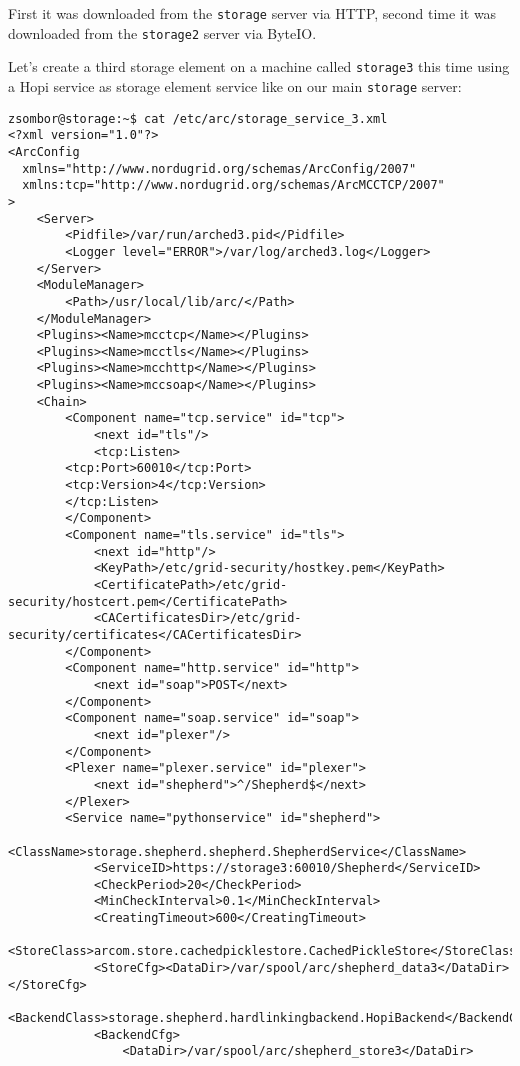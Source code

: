 \documentclass{book}
\begin{document}
First it was downloaded from the \verb!storage! server via HTTP, second time it was downloaded from the \verb!storage2! server via ByteIO.

Let's create a third storage element on a machine called \verb!storage3! this time using a Hopi service as storage element service like on our main \verb!storage! server:

\begin{verbatim}
zsombor@storage:~$ cat /etc/arc/storage_service_3.xml 
<?xml version="1.0"?>
<ArcConfig 
  xmlns="http://www.nordugrid.org/schemas/ArcConfig/2007"
  xmlns:tcp="http://www.nordugrid.org/schemas/ArcMCCTCP/2007"
>
    <Server>
        <Pidfile>/var/run/arched3.pid</Pidfile>
        <Logger level="ERROR">/var/log/arched3.log</Logger>
    </Server>
    <ModuleManager>
        <Path>/usr/local/lib/arc/</Path>
    </ModuleManager>
    <Plugins><Name>mcctcp</Name></Plugins>
    <Plugins><Name>mcctls</Name></Plugins>
    <Plugins><Name>mcchttp</Name></Plugins>
    <Plugins><Name>mccsoap</Name></Plugins>
    <Chain>
        <Component name="tcp.service" id="tcp">
            <next id="tls"/> 
            <tcp:Listen>
		<tcp:Port>60010</tcp:Port>
		<tcp:Version>4</tcp:Version>
	    </tcp:Listen>
        </Component>
        <Component name="tls.service" id="tls">
            <next id="http"/>
            <KeyPath>/etc/grid-security/hostkey.pem</KeyPath>
            <CertificatePath>/etc/grid-security/hostcert.pem</CertificatePath>
            <CACertificatesDir>/etc/grid-security/certificates</CACertificatesDir>
        </Component>
        <Component name="http.service" id="http">
            <next id="soap">POST</next>
        </Component>
        <Component name="soap.service" id="soap">
            <next id="plexer"/>
        </Component>
        <Plexer name="plexer.service" id="plexer">
            <next id="shepherd">^/Shepherd$</next>
        </Plexer>
        <Service name="pythonservice" id="shepherd">
            <ClassName>storage.shepherd.shepherd.ShepherdService</ClassName>
            <ServiceID>https://storage3:60010/Shepherd</ServiceID>
            <CheckPeriod>20</CheckPeriod>
            <MinCheckInterval>0.1</MinCheckInterval>
            <CreatingTimeout>600</CreatingTimeout>
            <StoreClass>arcom.store.cachedpicklestore.CachedPickleStore</StoreClass>
            <StoreCfg><DataDir>/var/spool/arc/shepherd_data3</DataDir></StoreCfg>
            <BackendClass>storage.shepherd.hardlinkingbackend.HopiBackend</BackendClass>
            <BackendCfg>
                <DataDir>/var/spool/arc/shepherd_store3</DataDir>

\end{verbatim}
\end{document}
